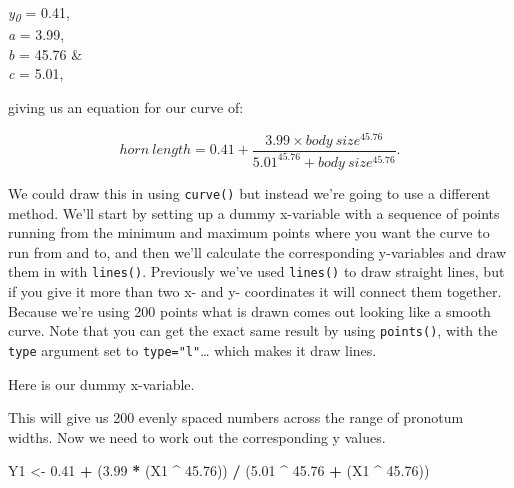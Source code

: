 \documentclass[
]{book}
\newenvironment{Shaded}{\begin{snugshade}}{\end{snugshade}}
\newcommand{\DataTypeTok}[1]{\textcolor[rgb]{0.13,0.29,0.53}{#1}}
\newcommand{\DecValTok}[1]{\textcolor[rgb]{0.00,0.00,0.81}{#1}}
\newcommand{\FloatTok}[1]{\textcolor[rgb]{0.00,0.00,0.81}{#1}}
\newcommand{\KeywordTok}[1]{\textcolor[rgb]{0.13,0.29,0.53}{\textbf{#1}}}
\newcommand{\NormalTok}[1]{#1}
\newcommand{\OperatorTok}[1]{\textcolor[rgb]{0.81,0.36,0.00}{\textbf{#1}}}
\newcommand{\OtherTok}[1]{\textcolor[rgb]{0.56,0.35,0.01}{#1}}
\newcommand{\StringTok}[1]{\textcolor[rgb]{0.31,0.60,0.02}{#1}}
\begin{document}
\emph{y\textsubscript{0}} = 0.41,\\
\emph{a} = 3.99,\\
\emph{b} = 45.76 \&\\
\emph{c} = 5.01,

giving us an equation for our curve of:

\[ horn \: length  = 0.41 + \frac{3.99 \times body \: size^{45.76}}{5.01^{45.76} + body \: size^{45.76}}. \]

We could draw this in using \texttt{curve()} but instead we're going to use a different method. We'll start by setting up a dummy x-variable with a sequence of points running from the minimum and maximum points where you want the curve to run from and to, and then we'll calculate the corresponding y-variables and draw them in with \texttt{lines()}. Previously we've used \texttt{lines()} to draw straight lines, but if you give it more than two x- and y- coordinates it will connect them together. Because we're using 200 points what is drawn comes out looking like a smooth curve. Note that you can get the exact same result by using \texttt{points()}, with the \texttt{type} argument set to \texttt{type="l"}\ldots{} which makes it draw lines.

Here is our dummy x-variable.

\begin{Shaded}
\end{Shaded}

This will give us 200 evenly spaced numbers across the range of pronotum widths. Now we need to work out the corresponding y values.

\begin{Shaded}
\begin{Highlighting}[]
\NormalTok{Y1 <-}\StringTok{ }\FloatTok{0.41} \OperatorTok{+}\StringTok{ }\NormalTok{(}\FloatTok{3.99} \OperatorTok{*}\StringTok{ }\NormalTok{(X1 }\OperatorTok{^}\StringTok{ }\FloatTok{45.76}\NormalTok{)) }\OperatorTok{/}\StringTok{ }\NormalTok{(}\FloatTok{5.01} \OperatorTok{^}\StringTok{ }\FloatTok{45.76} \OperatorTok{+}\StringTok{ }\NormalTok{(X1 }\OperatorTok{^}\StringTok{ }\FloatTok{45.76}\NormalTok{))}
\end{Highlighting}
\end{Shaded}
\end{document}
